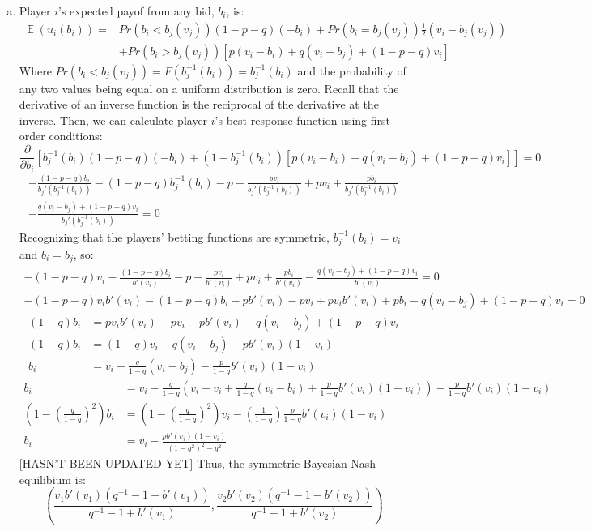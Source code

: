 \documentclass{article}
\newcommand{\binv}[1]{b_j^{-1}\left(#1\right)}
\DeclareMathOperator{\E}{\mathbb{E}}%
\begin{document}
\begin{enumerate}[(a)]
	
	\item Player $i$'s expected payof from any bid, $b_i$, is:
		\begin{align*}
			\E(u_i(b_i)) = &Pr(b_i<b_j(v_j))(1-p-q)(-b_i) +  Pr(b_i=b_j(v_j))\frac{1}{2}(v_i-b_j(v_j)) \\
							&+  Pr(b_i>b_j(v_j))[p(v_i-b_i) + q(v_i-b_j) + (1-p-q)v_i]
		\end{align*}
		Where $Pr(b_i<b_j(v_j))=F(\binv{b_i})=\binv{b_i}$ and the probability of any two values being equal on a uniform distribution is zero. Recall that the derivative of an inverse function is the reciprocal of the derivative at the inverse. Then, we can calculate player $i$'s best response function using first-order conditions:
		$$ \frac{\partial}{\partial b_i}\left[\binv{b_i}(1-p-q)(-b_i) + \left(1-\binv{b_i}\right)[p(v_i-b_i) + q(v_i-b_j) + (1-p-q)v_i]\right] = 0	$$
		\begin{align*}
			-\frac{(1-p-q)b_i}{b_j'\left(\binv{b_i}\right)} - (1-p-q)\binv{b_i} -p - \frac{pv_i}{b_j'\left(\binv{b_i}\right)} + pv_i + \frac{pb_i}{b_j'\left(\binv{b_i}\right)} 	\\
				- \frac{q(v_i-b_j) + (1-p-q)v_i}{b_j'\left(\binv{b_i}\right)} = 0
		\end{align*}
		Recognizing that the players' betting functions are symmetric, ${\binv{b_i}=v_i}$ and ${b_i=b_j}$, so:
		\begin{align*}
			-(1-p-q)v_i - \frac{(1-p-q)b_i}{b'(v_i)}-p-\frac{pv_i}{b'(v_i)} + pv_i + \frac{pb_i}{b'(v_i)} - \frac{q(v_i-b_j) + (1-p-q)v_i}{b'(v_i)} = 0	\\
			-(1-p-q)v_ib'(v_i) - (1-p-q)b_i - pb'(v_i) - pv_i + pv_ib'(v_i) + pb_i - q(v_i-b_j) + (1-p-q)v_i = 0
		\end{align*}
		\begin{align*}
			(1-q)b_i 	&= pv_ib'(v_i) - pv_i - pb'(v_i) - q(v_i - b_j) + (1-p-q)v_i 	\\
			(1-q)b_i 	&= (1-q)v_i - q(v_i-b_j) - pb'(v_i)(1-v_i)						\\
			b_i			&= v_i - \frac{q}{1-q}(v_i-b_j) - \frac{p}{1-q}b'(v_i)(1-v_i)	
		\end{align*}
		\begin{align*}
			b_i			&= v_i - \frac{q}{1-q}\left(v_i-v_i + \frac{q}{1-q}(v_i-b_i) + \frac{p}{1-q}b'(v_i)(1-v_i)\right) - \frac{p}{1-q}b'(v_i)(1-v_i)	 \\
			\left(1-\left(\frac{q}{1-q}\right)^2\right)b_i &= \left(1-\left(\frac{q}{1-q}\right)^2\right)v_i - \left(\frac{1}{1-q}\right)\frac{p}{1-q}b'(v_i)(1-v_i)	\\
			b_i &= v_i - \frac{pb'(v_i)(1-v_i)}{(1-q^2)^2 - q^2}
		\end{align*}
		[HASN'T BEEN UPDATED YET] Thus, the symmetric Bayesian Nash equilibium is:
		\[
			\left(\frac{v_1b'(v_1)\left(q^{-1}-1-b'(v_1)\right)}{q^{-1} - 1 + b'(v_1)},\frac{v_2b'(v_2)\left(q^{-1}-1-b'(v_2)\right)}{q^{-1} - 1 + b'(v_2)}\right)
		\]
	

\end{enumerate}
\end{document}
